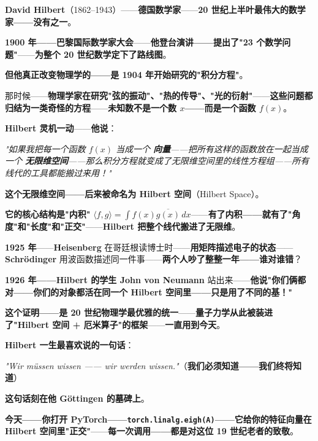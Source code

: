 \begin{tcolorbox}[storybox={\Large 小故事：Hilbert 与"Hilbert 空间"的诞生（1904 · Göttingen）}]
\textbf{David Hilbert}（1862--1943）——\textbf{德国数学家}——\textbf{20 世纪上半叶最伟大的数学家——没有之一}。

\medskip

\textbf{1900 年——巴黎国际数学家大会}——\textbf{他登台演讲——提出了"23 个数学问题"}——\textbf{为整个 20 世纪数学定下了路线图}。

\medskip

\textbf{但他真正改变物理学的——是 1904 年开始研究的"积分方程"}。

\medskip

那时候——\textbf{物理学家在研究"弦的振动"、"热的传导"、"光的衍射"}——\textbf{这些问题都归结为一类奇怪的方程}——\textbf{未知数不是一个数 $x$——而是一个函数 $f(x)$}。

\medskip

\textbf{Hilbert 灵机一动}——\textbf{他说}：

\medskip

\textit{"如果我把每一个函数 $f(x)$ 当成一个 \textbf{向量}——把所有这样的函数放在一起当成一个 \textbf{无限维空间}——那么积分方程就变成了无限维空间里的线性方程组——所有线代的工具都能搬过来用！"}

\medskip

\textbf{这个无限维空间——后来被命名为 Hilbert 空间}（Hilbert Space）。

\medskip

\textbf{它的核心结构是"内积"} $\langle f, g \rangle = \int f(x)\overline{g(x)}\,dx$——\textbf{有了内积——就有了"角度"和"长度"和"正交"}——\textbf{Hilbert 把整个线代搬进了无限维}。

\medskip

\textbf{1925 年}——\textbf{Heisenberg} 在哥廷根读博士时——\textbf{用矩阵描述电子的状态}——\textbf{Schrödinger} 用波函数描述同一件事——\textbf{两个人吵了整整一年——谁对谁错}？

\medskip

\textbf{1926 年——Hilbert 的学生 John von Neumann} 站出来——\textbf{他说"你们俩都对——你们的对象都活在同一个 Hilbert 空间里——只是用了不同的基！"}

\medskip

\textbf{这个证明——是 20 世纪物理学最优雅的统一}——\textbf{量子力学从此被装进了"Hilbert 空间 + 厄米算子"的框架}——\textbf{一直用到今天}。

\medskip

\textbf{Hilbert 一生最喜欢说的一句话}：

\medskip

\textit{"Wir m\"ussen wissen —— wir werden wissen."}（\textbf{我们必须知道——我们终将知道}）

\medskip

\textbf{这句话刻在他 Göttingen 的墓碑上}。

\medskip

\textbf{今天——你打开 PyTorch——\texttt{torch.linalg.eigh(A)}——它给你的特征向量在 Hilbert 空间里"正交"}——\textbf{每一次调用——都是对这位 19 世纪老者的致敬}。
\end{tcolorbox}

